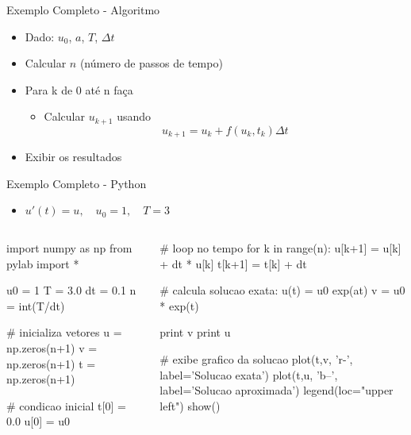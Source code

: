 \documentclass[12pt,t,graphics]{beamer}
\begin{document}
\begin{frame}[t,fragile]{Exemplo Completo - Algoritmo}
	\begin{itemize}
		\item Dado: $u_0$, $a$, $T$, $\Delta t$
		\item Calcular $n$ (número de passos de tempo)
		\item Para k de 0 até n faça
		\begin{itemize}
			\item Calcular $u_{k+1}$ usando 
			$$u_{k+1} = u_k + f(u_k, t_k) \Delta t$$
		\end{itemize}
		\item Exibir os resultados
	\end{itemize}
\end{frame}

\begin{frame}[t,fragile]{Exemplo Completo - Python}
	\begin{itemize}
		\item $u'(t) = u, \quad u_0 = 1, \quad T = 3$
	\end{itemize}
	\begin{columns}
		\begin{python}[]
		import numpy as np
		from pylab import *
		
		u0 = 1
		T  = 3.0
		dt = 0.1
		n  = int(T/dt)
		
		# inicializa vetores
		u = np.zeros(n+1)
		v = np.zeros(n+1)
		t = np.zeros(n+1)
		
		# condicao inicial
		t[0] = 0.0
		u[0] = u0
		\end{python}
		\begin{python}[]
		# loop no tempo
		for k in range(n):
		u[k+1] = u[k] + dt * u[k]
		t[k+1] = t[k] + dt
		
		# calcula solucao exata: u(t) = u0 exp(at)
		v = u0 * exp(t)
		
		print v
		print u
		
		# exibe grafico da solucao
		plot(t,v, 'r-',  label='Solucao exata')
		plot(t,u, 'b--', label='Solucao aproximada')
		legend(loc="upper left")
		show()    
		\end{python}
	\end{columns}
\end{frame}
\end{document}
